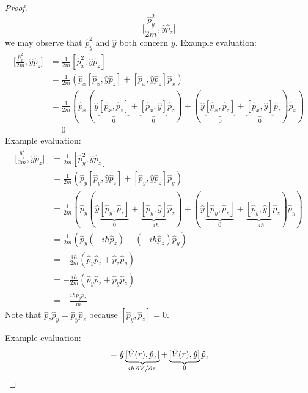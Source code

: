 \documentclass[../psets.tex]{subfiles}
\begin{document}
\begin{enumerate}
\begin{enumerate}
\begin{proof}
            \begin{equation*}
                \Bigg[ \frac{\hat{p}_y^2}{2m},\hat{y}\hat{p}_z \Bigg]
            \end{equation*}
            we may observe that $\hat{p}_y^2$ and $\hat{y}$ both concern $y$.
            Example evaluation:
            \begin{align*}
                \Bigg[ \frac{\hat{p}_x^2}{2m},\hat{y}\hat{p}_z \Bigg] &= \frac{1}{2m}[\hat{p}_x^2,\hat{y}\hat{p}_z]\\
                &= \frac{1}{2m}(\hat{p}_x[\hat{p}_x,\hat{y}\hat{p}_z]+[\hat{p}_x,\hat{y}\hat{p}_z]\hat{p}_x)\\
                &= \frac{1}{2m}(\hat{p}_x(\hat{y}\underbrace{[\hat{p}_x,\hat{p}_z]}_0+\underbrace{[\hat{p}_x,\hat{y}]}_0\hat{p}_z)+(\hat{y}\underbrace{[\hat{p}_x,\hat{p}_z]}_0+\underbrace{[\hat{p}_x,\hat{y}]}_0\hat{p}_z)\hat{p}_x)\\
                &= 0
            \end{align*}
            Example evaluation:
            \begingroup
            \allowdisplaybreaks
            \begin{align*}
                \Bigg[ \frac{\hat{p}_y^2}{2m},\hat{y}\hat{p}_z \Bigg] &= \frac{1}{2m}[\hat{p}_y^2,\hat{y}\hat{p}_z]\\
                &= \frac{1}{2m}(\hat{p}_y[\hat{p}_y,\hat{y}\hat{p}_z]+[\hat{p}_y,\hat{y}\hat{p}_z]\hat{p}_y)\\
                &= \frac{1}{2m}(\hat{p}_y(\hat{y}\underbrace{[\hat{p}_y,\hat{p}_z]}_0+\underbrace{[\hat{p}_y,\hat{y}]}_{-i\hbar}\hat{p}_z)+(\hat{y}\underbrace{[\hat{p}_y,\hat{p}_z]}_0+\underbrace{[\hat{p}_y,\hat{y}]}_{-i\hbar}\hat{p}_z)\hat{p}_y)\\
                &= \frac{1}{2m}(\hat{p}_y(-i\hbar\hat{p}_z)+(-i\hbar\hat{p}_z)\hat{p}_y)\\
                &= -\frac{i\hbar}{2m}(\hat{p}_y\hat{p}_z+\hat{p}_z\hat{p}_y)\\
                &= -\frac{i\hbar}{2m}(\hat{p}_y\hat{p}_z+\hat{p}_y\hat{p}_z)\\
                &= -\frac{i\hbar\hat{p}_y\hat{p}_z}{m}
            \end{align*}
            \endgroup
            Note that $\hat{p}_z\hat{p}_y=\hat{p}_y\hat{p}_z$ because $[\hat{p}_y,\hat{p}_z]=0$.\par
            Example evaluation:
            \begin{align*}
                [\hat{V}(r),\hat{y}\hat{p}_z] &= \hat{y}\underbrace{[\hat{V}(r),\hat{p}_z]}_{i\hbar\pdv*{V}{z}}+\underbrace{[\hat{V}(r),\hat{y}]}_0\hat{p}_z\\

\end{align*}
\end{proof}
\end{enumerate}
\end{enumerate}
\end{document}
